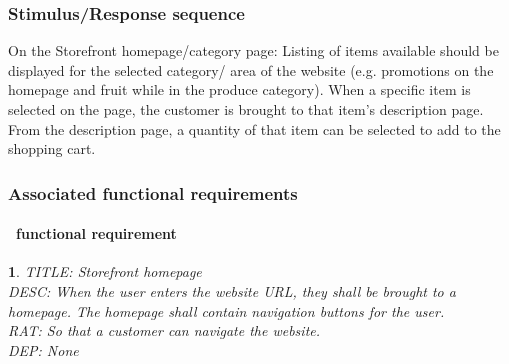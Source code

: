 \documentclass{scrreprt}
\theoremstyle{funreq}
\newtheorem{funreq}{}
\begin{document}
\subsubsection{Stimulus/Response sequence}
On the Storefront homepage/category page: Listing of items available should be displayed for the selected category/ area of the website (e.g. promotions on the homepage and fruit while in the produce category).  When a specific item is selected on the page, the customer is brought to that item’s description page.  From the description page, a quantity of that item can be selected to add to the shopping cart.  
\subsubsection{Associated functional requirements}

\paragraph[]{\Subsectionname ~functional requirement }
\begin{funreq}
	\label{store_home}
	TITLE: Storefront homepage\\
	DESC: When the user enters the website URL, they shall be brought to a homepage.  The homepage shall contain navigation buttons for the user.\\
	RAT: So that a customer can navigate the website.\\
	DEP: None\\
\end{funreq}


\end{document}

